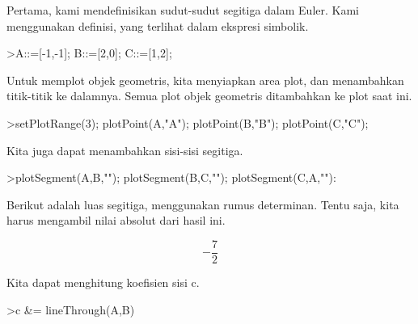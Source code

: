 \documentclass[a4paper,10pt]{article}
\begin{document}
\begin{eulernotebook}
\begin{eulercomment}
\begin{eulercomment}
\begin{eulercomment}
\begin{eulercomment}
\begin{eulercomment}
\begin{eulercomment}
\begin{eulercomment}
\begin{eulercomment}
\begin{eulercomment}
\begin{eulercomment}
\begin{eulercomment}
\begin{eulercomment}
\begin{eulercomment}
\begin{eulercomment}
\begin{eulercomment}
\begin{eulercomment}
\begin{eulercomment}
\begin{eulercomment}
\begin{eulercomment}
\begin{eulercomment}
\begin{eulercomment}
\begin{eulercomment}
\begin{eulercomment}
\begin{eulercomment}
\begin{eulercomment}
\begin{eulercomment}
\begin{eulercomment}
\begin{eulercomment}
\begin{eulercomment}
\begin{eulercomment}
\begin{eulercomment}
Pertama, kami mendefinisikan sudut-sudut segitiga dalam Euler. Kami
menggunakan definisi, yang terlihat dalam ekspresi simbolik.
\end{eulercomment}
\begin{eulerprompt}
>A::=[-1,-1]; B::=[2,0]; C::=[1,2];
\end{eulerprompt}
\begin{eulercomment}
Untuk memplot objek geometris, kita menyiapkan area plot, dan
menambahkan titik-titik ke dalamnya. Semua plot objek geometris
ditambahkan ke plot saat ini.
\end{eulercomment}
\begin{eulerprompt}
>setPlotRange(3); plotPoint(A,"A"); plotPoint(B,"B"); plotPoint(C,"C");
\end{eulerprompt}
\begin{eulercomment}
Kita juga dapat menambahkan sisi-sisi segitiga.
\end{eulercomment}
\begin{eulerprompt}
>plotSegment(A,B,""); plotSegment(B,C,""); plotSegment(C,A,""):
\end{eulerprompt}
\begin{eulercomment}
Berikut adalah luas segitiga, menggunakan rumus determinan. Tentu
saja, kita harus mengambil nilai absolut dari hasil ini.
\end{eulercomment}
\begin{eulerformula}
\[
-\frac{7}{2}
\]
\end{eulerformula}
\begin{eulercomment}
Kita dapat menghitung koefisien sisi c.
\end{eulercomment}
\begin{eulerprompt}
>c &= lineThrough(A,B)
\end{eulerprompt}
\begin{euleroutput}
  

\end{euleroutput}
\end{eulercomment}
\end{eulercomment}
\end{eulercomment}
\end{eulercomment}
\end{eulercomment}
\end{eulercomment}
\end{eulercomment}
\end{eulercomment}
\end{eulercomment}
\end{eulercomment}
\end{eulercomment}
\end{eulercomment}
\end{eulercomment}
\end{eulercomment}
\end{eulercomment}
\end{eulercomment}
\end{eulercomment}
\end{eulercomment}
\end{eulercomment}
\end{eulercomment}
\end{eulercomment}
\end{eulercomment}
\end{eulercomment}
\end{eulercomment}
\end{eulercomment}
\end{eulercomment}
\end{eulercomment}
\end{eulercomment}
\end{eulercomment}
\end{eulercomment}
\end{eulernotebook}
\end{document}
